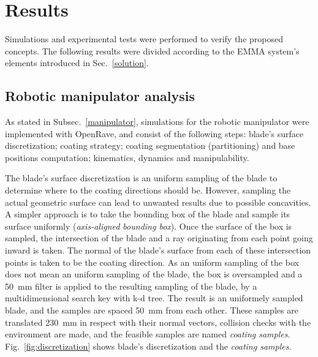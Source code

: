 \section{Results}



Simulations and experimental tests were performed to verify the proposed
concepts. The following results were divided according to the EMMA system's
elements introduced in Sec.~\ref{solution}. 


\subsection{Robotic manipulator analysis}\label{sec::man_analysis}

As stated in Subsec.~\ref{manipulator}, simulations for the robotic
manipulator were implemented with OpenRave, and consist of the following steps:
blade's surface discretization; coating strategy; coating segmentation
(partitioning) and base positions computation; kinematics, dynamics and
manipulability.

The blade's surface discretization is an uniform sampling of the blade to
determine where to the coating directions should be. However, sampling the
actual geometric surface can lead to unwanted results due to possible
concavities. A simpler approach is to take the bounding box of the blade and
sample its surface uniformly (\textit{axis-aligned bounding box}). Once the
surface of the box is sampled, the intersection of the blade and a ray
originating from each point going inward is taken. The normal of the blade's
surface from each of these intersection points is taken to be the coating
direction. As an uniform sampling of the box does not mean an uniform sampling
of the blade, the box is oversampled and a 50~mm filter is applied to the
resulting sampling of the blade, by a multidimensional search key with k-d tree.
The result is an uniformely sampled blade, and the samples are spaced
50~mm from each other. These samples are translated 230~mm in respect with their
normal vectors, collision checks with the environment are made, and the
feasible samples are named \textit{coating samples}.
Fig.~\ref{fig:discretization} shows blade's discretization and the
\textit{coating samples}. 

